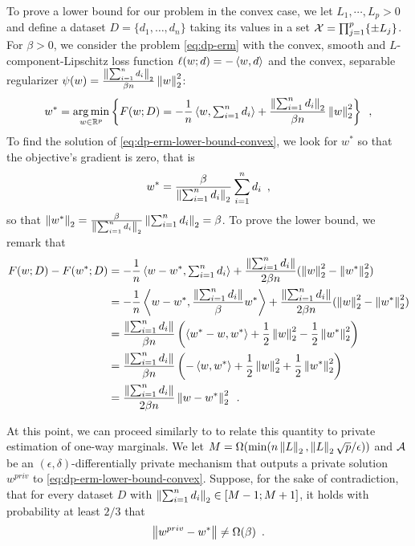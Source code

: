 To prove a lower bound for our problem in the convex case, we let $L_1,
  \cdots, L_p > 0$ and
define a dataset $D = \{d_1, \dots, d_n\}$ taking its values in a set
$\mathcal X = \prod_{j=1}^p \{\pm L_j\}$.
For $\beta > 0$, we consider the problem
\eqref{eq:dp-erm}
with the convex, smooth and $L$-component-Lipschitz loss function
$\ell(w; d) = - \left\langle w, d \right\rangle$ and the convex, separable regularizer
$\psi(w) = \frac{\left \lVert \sum_{i=1}^n d_i \right \rVert_2}{\beta n} \left \lVert w \right \rVert_2^2$:
\begin{align}
  \label{eq:dp-erm-lower-bound-convex}
  w^* = \operatorname*{arg\,min}_{w\in\mathbb R^p} \left\{
  F(w; D) = - \frac{1}{n}\left\langle w, \textstyle{\sum_{i=1}^n d_i} \right\rangle
  + \frac{\left \lVert \sum_{i=1}^n d_i \right \rVert_2}{\beta n} \left \lVert w \right \rVert_2^2 \right\}\enspace,
\end{align}
To find the solution of \eqref{eq:dp-erm-lower-bound-convex}, we look for $w^*$
so that the objective's gradient is zero, that is
\begin{align}
  \label{eq:dp-erm-lower-bound-convex-grad-obj-zero}
  w^* = \frac{\beta}{\left \lVert \sum_{i=1}^n d_i \right \rVert_2} \sum_{i=1}^n d_i\enspace,
\end{align}
so that $\left \lVert w^* \right \rVert_2 =  \frac{\beta}{\left \lVert \sum_{i=1}^n d_i \right \rVert_2} \left \lVert \sum_{i=1}^n d_i \right \rVert_2 = \beta$.
To prove the lower bound, we remark that
\begin{align}
  F(w; D) - F(w^*; D)
   & = - \frac{1}{n} \left\langle w - w^*, \textstyle{\sum_{i=1}^n d_i} \right\rangle
  + \frac{\left \lVert \textstyle{\sum_{i=1}^n d_i} \right \rVert}{2 \beta n} (\left \lVert w \right \rVert^2_2 - \left \lVert w^* \right \rVert_2^2)      \\
   & = - \frac{1}{n} \left\langle w - w^*, \frac{\left \lVert \textstyle{\sum_{i=1}^n d_i} \right \rVert}{\beta} w^* \right\rangle
  + \frac{\left \lVert \textstyle{\sum_{i=1}^n d_i} \right \rVert}{2\beta n} (\left \lVert w \right \rVert^2_2 - \left \lVert w^* \right \rVert_2^2)       \\
   & = \frac{\left \lVert \textstyle{\textstyle{\sum_{i=1}^n d_i}} \right \rVert}{\beta n}
  \left( \left\langle w^* - w, w^* \right\rangle + \frac{1}{2} \left \lVert w \right \rVert_2^2 - \frac{1}{2} \left \lVert w^* \right \rVert_2^2 \right) \\
   & = \frac{\left \lVert \textstyle{\textstyle{\sum_{i=1}^n d_i}} \right \rVert}{\beta n}
  \left( - \left\langle w, w^* \right\rangle + \frac{1}{2} \left \lVert w \right \rVert_2^2 + \frac{1}{2} \left \lVert w^* \right \rVert_2^2 \right)     \\
   & = \frac{\left \lVert \textstyle{\textstyle{\sum_{i=1}^n d_i}} \right \rVert}{2 \beta n}
  \left \lVert w - w^* \right \rVert_2^2\enspace.
\end{align}

At this point, we can proceed similarly to \citet{bassily2014Private}
to relate this quantity to private estimation of one-way marginals.
We let $M = \Omega(\min(n\left \lVert L \right \rVert_2, \left \lVert L \right \rVert_2\sqrt{p}/\epsilon))$
and $\mathcal A$ be an $(\epsilon,\delta)$-differentially private mechanism
that outputs a private solution $w^{priv}$ to
\eqref{eq:dp-erm-lower-bound-convex}.  Suppose, for the sake of
contradiction, that for every dataset $D$ with
$\left \lVert \textstyle{\sum_{i=1}^n d_i} \right \rVert_2 \in [M-1; M+1]$, it holds with
probability at least $2/3$ that
\begin{align}
  \label{lower-bound-convex-function-inequality-beta}
  \left \lVert w^{priv} - w^* \right \rVert \neq \Omega(\beta)\enspace.
\end{align}


